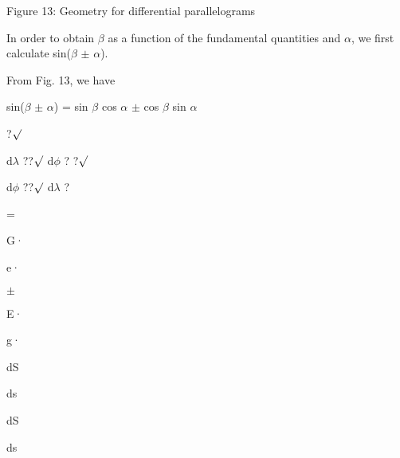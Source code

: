 \documentclass[a4paper,portrait,12pt]{article}
\begin{document}
\begin{flushleft}
Figure 13: Geometry for differential parallelograms
\end{flushleft}


\begin{flushleft}
In order to obtain $\beta$ as a function of the fundamental quantities and $\alpha$, we first calculate sin($\beta$ $\pm$ $\alpha$).
\end{flushleft}


\begin{flushleft}
From Fig. 13, we have
\end{flushleft}


\begin{flushleft}
sin($\beta$ $\pm$ $\alpha$) = sin $\beta$ cos $\alpha$ $\pm$ cos $\beta$ sin $\alpha$
\end{flushleft}


?$\surd$


\begin{flushleft}
d$\lambda$ ??$\surd$ d$\phi$ ? ?$\surd$
\end{flushleft}


\begin{flushleft}
d$\phi$ ??$\surd$ d$\lambda$ ?
\end{flushleft}


=


\begin{flushleft}
G·
\end{flushleft}


\begin{flushleft}
e·
\end{flushleft}


$\pm$


\begin{flushleft}
E·
\end{flushleft}


\begin{flushleft}
g·
\end{flushleft}


\begin{flushleft}
dS
\end{flushleft}


\begin{flushleft}
ds
\end{flushleft}


\begin{flushleft}
dS
\end{flushleft}


\begin{flushleft}
ds
\end{flushleft}
\end{document}
